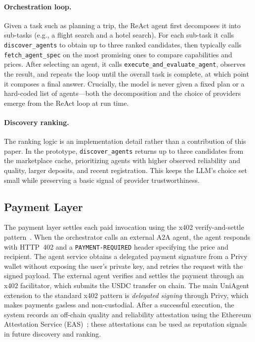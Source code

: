 \documentclass[sigconf]{acmart}
\begin{document}
\paragraph{Orchestration loop.}
Given a task such as planning a trip, the ReAct agent first decomposes
it into sub-tasks (e.g., a flight search and a hotel search). For each
sub-task it calls \texttt{discover\_agents} to obtain up to three ranked
candidates, then typically calls \texttt{fetch\_agent\_spec} on the most
promising ones to compare capabilities and prices. After selecting an
agent, it calls \texttt{execute\_and\_evaluate\_agent}, observes the
result, and repeats the loop until the overall task is complete, at which
point it composes a final answer. Crucially, the model is never given a fixed
plan or a hard-coded list of agents---both the decomposition and the
choice of providers emerge from the ReAct loop at run time.

\paragraph{Discovery ranking.}
The ranking logic is an implementation detail rather than a contribution
of this paper. In the prototype, \texttt{discover\_agents} returns up to
three candidates from the marketplace cache, prioritizing agents with
higher observed reliability and quality, larger deposits, and recent
registration. This keeps the LLM's choice set small while preserving a
basic signal of provider trustworthiness.

\subsection{Payment Layer}
\label{sec:payment-layer}

The payment layer settles each paid invocation using the x402
verify-and-settle pattern~\cite{x402whitepaper}. When the orchestrator
calls an external A2A agent, the agent responds with HTTP~402 and a
\texttt{PAYMENT\allowbreak-\allowbreak REQUIRED} header specifying the price and recipient. The
agent service obtains a delegated payment signature from a Privy wallet
without exposing the user's private key, and retries the request with
the signed payload. The external agent verifies and settles the payment
through an x402 facilitator, which submits the USDC transfer on chain.
The main UniAgent extension to the standard x402 pattern is
\emph{delegated signing} through Privy, which makes payments gasless and
non-custodial. After a successful execution, the system records an
off-chain quality and reliability attestation using the Ethereum
Attestation Service (EAS)~\cite{eas}; these attestations can be used as
reputation signals in future discovery and ranking.
\end{document}
